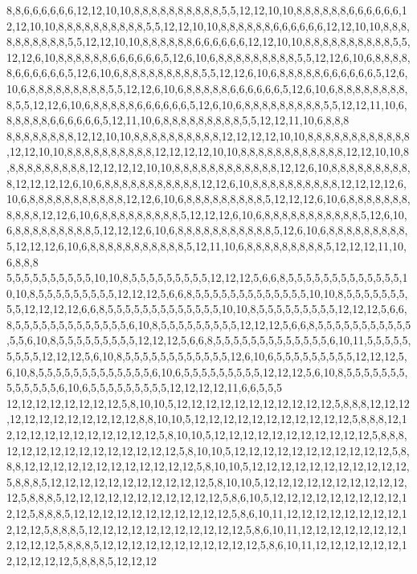 8,8,6,6,6,6,6,6,12,12,10,10,8,8,8,8,8,8,8,8,8,8,5,5,12,12,10,10,8,8,8,8,8,8,6,6,6,6,6,6,12,12,10,10,8,8,8,8,8,8,8,8,8,8,5,5,12,12,10,10,8,8,8,8,8,8,6,6,6,6,6,6,12,12,10,10,8,8,8,8,8,8,8,8,8,8,5,5,12,12,10,10,8,8,8,8,8,8,6,6,6,6,6,6,12,12,10,10,8,8,8,8,8,8,8,8,8,8,5,5,12,12,6,10,8,8,8,8,8,8,6,6,6,6,6,6,5,12,6,10,6,8,8,8,8,8,8,8,8,8,5,5,12,12,6,10,6,8,8,8,8,8,6,6,6,6,6,6,5,12,6,10,6,8,8,8,8,8,8,8,8,8,5,5,12,12,6,10,6,8,8,8,8,8,6,6,6,6,6,6,5,12,6,10,6,8,8,8,8,8,8,8,8,8,5,5,12,12,6,10,6,8,8,8,8,8,6,6,6,6,6,6,5,12,6,10,6,8,8,8,8,8,8,8,8,8,5,5,12,12,6,10,6,8,8,8,8,8,6,6,6,6,6,6,5,12,6,10,6,8,8,8,8,8,8,8,8,8,5,5,12,12,11,10,6,8,8,8,8,8,6,6,6,6,6,6,5,12,11,10,6,8,8,8,8,8,8,8,8,8,5,5,12,12,11,10,6,8,8,8
8,8,8,8,8,8,8,8,12,12,10,10,8,8,8,8,8,8,8,8,8,8,12,12,12,12,10,10,8,8,8,8,8,8,8,8,8,8,8,8,12,12,10,10,8,8,8,8,8,8,8,8,8,8,12,12,12,12,10,10,8,8,8,8,8,8,8,8,8,8,8,8,12,12,10,10,8,8,8,8,8,8,8,8,8,8,12,12,12,12,10,10,8,8,8,8,8,8,8,8,8,8,8,8,12,12,6,10,8,8,8,8,8,8,8,8,8,8,12,12,12,12,6,10,6,8,8,8,8,8,8,8,8,8,8,8,12,12,6,10,8,8,8,8,8,8,8,8,8,8,12,12,12,12,6,10,6,8,8,8,8,8,8,8,8,8,8,8,12,12,6,10,6,8,8,8,8,8,8,8,8,8,5,12,12,12,6,10,6,8,8,8,8,8,8,8,8,8,8,8,12,12,6,10,6,8,8,8,8,8,8,8,8,8,5,12,12,12,6,10,6,8,8,8,8,8,8,8,8,8,8,8,5,12,6,10,6,8,8,8,8,8,8,8,8,8,5,12,12,12,6,10,6,8,8,8,8,8,8,8,8,8,8,8,5,12,6,10,6,8,8,8,8,8,8,8,8,8,5,12,12,12,6,10,6,8,8,8,8,8,8,8,8,8,8,8,5,12,11,10,6,8,8,8,8,8,8,8,8,8,5,12,12,12,11,10,6,8,8,8
5,5,5,5,5,5,5,5,5,5,10,10,8,5,5,5,5,5,5,5,5,5,12,12,12,5,6,6,8,5,5,5,5,5,5,5,5,5,5,5,5,5,10,10,8,5,5,5,5,5,5,5,5,5,12,12,12,5,6,6,8,5,5,5,5,5,5,5,5,5,5,5,5,5,10,10,8,5,5,5,5,5,5,5,5,5,12,12,12,12,6,6,8,5,5,5,5,5,5,5,5,5,5,5,5,5,10,10,8,5,5,5,5,5,5,5,5,5,12,12,12,5,6,6,8,5,5,5,5,5,5,5,5,5,5,5,5,5,6,10,8,5,5,5,5,5,5,5,5,5,12,12,12,5,6,6,8,5,5,5,5,5,5,5,5,5,5,5,5,5,6,10,8,5,5,5,5,5,5,5,5,5,12,12,12,5,6,6,8,5,5,5,5,5,5,5,5,5,5,5,5,5,6,10,11,5,5,5,5,5,5,5,5,5,12,12,12,5,6,10,8,5,5,5,5,5,5,5,5,5,5,5,5,12,6,10,6,5,5,5,5,5,5,5,5,5,12,12,12,5,6,10,8,5,5,5,5,5,5,5,5,5,5,5,5,5,6,10,6,5,5,5,5,5,5,5,5,5,12,12,12,5,6,10,8,5,5,5,5,5,5,5,5,5,5,5,5,5,6,10,6,5,5,5,5,5,5,5,5,5,12,12,12,12,11,6,6,5,5,5
12,12,12,12,12,12,12,12,5,8,10,10,5,12,12,12,12,12,12,12,12,12,12,12,5,8,8,8,12,12,12,12,12,12,12,12,12,12,12,12,8,8,10,10,5,12,12,12,12,12,12,12,12,12,12,12,5,8,8,8,12,12,12,12,12,12,12,12,12,12,12,12,5,8,10,10,5,12,12,12,12,12,12,12,12,12,12,12,5,8,8,8,12,12,12,12,12,12,12,12,12,12,12,12,5,8,10,10,5,12,12,12,12,12,12,12,12,12,12,12,5,8,8,8,12,12,12,12,12,12,12,12,12,12,12,12,5,8,10,10,5,12,12,12,12,12,12,12,12,12,12,12,5,8,8,8,5,12,12,12,12,12,12,12,12,12,12,12,5,8,10,10,5,12,12,12,12,12,12,12,12,12,12,12,5,8,8,8,5,12,12,12,12,12,12,12,12,12,12,12,5,8,6,10,5,12,12,12,12,12,12,12,12,12,12,12,5,8,8,8,5,12,12,12,12,12,12,12,12,12,12,12,5,8,6,10,11,12,12,12,12,12,12,12,12,12,12,12,5,8,8,8,5,12,12,12,12,12,12,12,12,12,12,12,5,8,6,10,11,12,12,12,12,12,12,12,12,12,12,12,5,8,8,8,5,12,12,12,12,12,12,12,12,12,12,12,5,8,6,10,11,12,12,12,12,12,12,12,12,12,12,12,5,8,8,8,5,12,12,12
